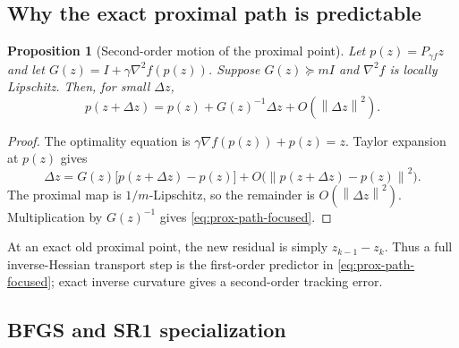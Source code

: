 \documentclass[10pt,leqno]{amsart}
\numberwithin{equation}{section}
\numberwithin{algorithm}{section}
\newtheorem{proposition}[theorem]{Proposition}
\theoremstyle{remark}
\newcommand{\norm}[1]{\left\lVert #1 \right\rVert}
\newcommand{\grad}{\nabla}
\begin{document}
\subsection{Why the exact proximal path is predictable}

\begin{proposition}[Second-order motion of the proximal point]
\label{prop:prox-path-focused}
Let $p(z)=P_{\gamma f}z$ and let
$G(z)=I+\gamma\grad^2f(p(z))$.  Suppose $G(z)\succeq mI$ and $\grad^2f$ is locally Lipschitz.  Then, for small $\Delta z$,
\begin{equation}
\label{eq:prox-path-focused}
    p(z+\Delta z)
    =p(z)+G(z)^{-1}\Delta z+O(\norm{\Delta z}^2).
\end{equation}
\end{proposition}

\begin{proof}
The optimality equation is
$\gamma\grad f(p(z))+p(z)=z$.  Taylor expansion at $p(z)$ gives
\[
    \Delta z=G(z)\bigl[p(z+\Delta z)-p(z)\bigr]
       +O\bigl(\norm{p(z+\Delta z)-p(z)}^2\bigr).
\]
The proximal map is $1/m$-Lipschitz, so the remainder is $O(\norm{\Delta z}^2)$.  Multiplication by $G(z)^{-1}$ gives \eqref{eq:prox-path-focused}.
\end{proof}

At an exact old proximal point, the new residual is simply $z_{k-1}-z_k$.  Thus a full inverse-Hessian transport step is the first-order predictor in \eqref{eq:prox-path-focused}; exact inverse curvature gives a second-order tracking error.

\subsection{BFGS and SR1 specialization}
\end{document}
